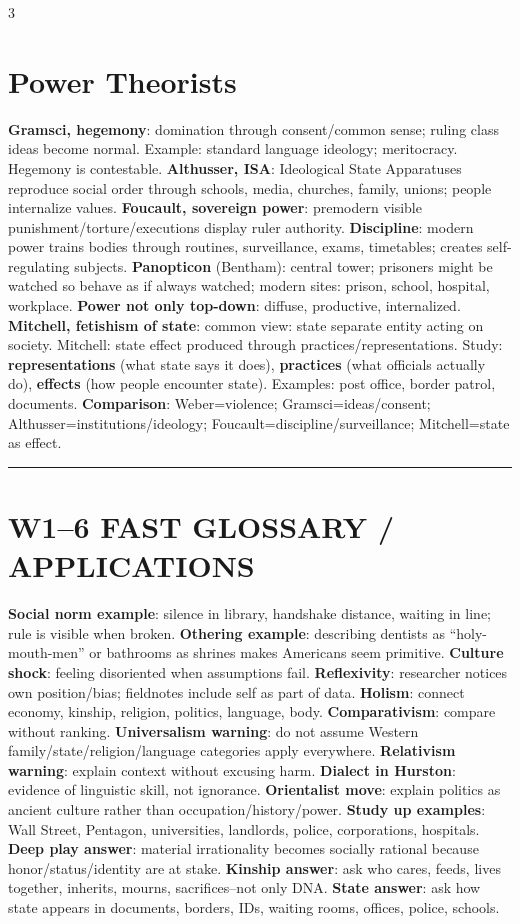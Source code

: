 \documentclass[10pt,landscape]{article}
\newcommand{\kw}[1]{\textbf{#1}}
\newcommand{\sep}{\vspace{0.8pt}\hrule\vspace{0.8pt}}
\begin{document}
\begin{multicols}{3}
\section*{Power Theorists}
\kw{Gramsci, hegemony}: domination through consent/common sense; ruling class ideas become normal. Example: standard language ideology; meritocracy. Hegemony is contestable. \kw{Althusser, ISA}: Ideological State Apparatuses reproduce social order through schools, media, churches, family, unions; people internalize values. \kw{Foucault, sovereign power}: premodern visible punishment/torture/executions display ruler authority. \kw{Discipline}: modern power trains bodies through routines, surveillance, exams, timetables; creates self-regulating subjects. \kw{Panopticon} (Bentham): central tower; prisoners might be watched so behave as if always watched; modern sites: prison, school, hospital, workplace. \kw{Power not only top-down}: diffuse, productive, internalized. \kw{Mitchell, fetishism of state}: common view: state separate entity acting on society. Mitchell: state effect produced through practices/representations. Study: \kw{representations} (what state says it does), \kw{practices} (what officials actually do), \kw{effects} (how people encounter state). Examples: post office, border patrol, documents. \kw{Comparison}: Weber=violence; Gramsci=ideas/consent; Althusser=institutions/ideology; Foucault=discipline/surveillance; Mitchell=state as effect.


\sep
\section*{W1--6 FAST GLOSSARY / APPLICATIONS}
\kw{Social norm example}: silence in library, handshake distance, waiting in line; rule is visible when broken. \kw{Othering example}: describing dentists as ``holy-mouth-men'' or bathrooms as shrines makes Americans seem primitive. \kw{Culture shock}: feeling disoriented when assumptions fail. \kw{Reflexivity}: researcher notices own position/bias; fieldnotes include self as part of data. \kw{Holism}: connect economy, kinship, religion, politics, language, body. \kw{Comparativism}: compare without ranking. \kw{Universalism warning}: do not assume Western family/state/religion/language categories apply everywhere. \kw{Relativism warning}: explain context without excusing harm. \kw{Dialect in Hurston}: evidence of linguistic skill, not ignorance. \kw{Orientalist move}: explain politics as ancient culture rather than occupation/history/power. \kw{Study up examples}: Wall Street, Pentagon, universities, landlords, police, corporations, hospitals. \kw{Deep play answer}: material irrationality becomes socially rational because honor/status/identity are at stake. \kw{Kinship answer}: ask who cares, feeds, lives together, inherits, mourns, sacrifices--not only DNA. \kw{State answer}: ask how state appears in documents, borders, IDs, waiting rooms, offices, police, schools.


\end{multicols}
\end{document}

